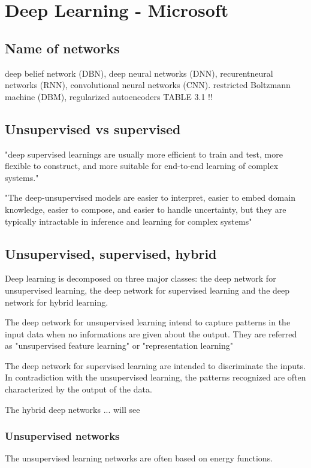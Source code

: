 



\section{Deep Learning - Microsoft}

	\subsection{Name of networks}
		deep belief network (DBN), 
		deep neural networks (DNN), recurentneural networks (RNN), convolutional neural networks (CNN).
		restricted Boltzmann machine (DBM), regularized autoencoders
		TABLE 3.1 !!

	\subsection{Unsupervised vs supervised}
		"deep supervised learnings are usually more efficient to train and test, more flexible to construct, and more suitable for end-to-end learning of complex systems."

		"The deep-unsupervised models are easier to interpret, easier to embed domain knowledge, easier to compose, and easier to handle uncertainty, but they are typically intractable in inference and learning for complex systems"


	\subsection{Unsupervised, supervised, hybrid}
		Deep learning is decomposed on three major classes: the deep network for unsupervised learning, the deep network for supervised learning and the deep network for hybrid learning.

		The deep network for unsupervised learning intend to capture patterns in the input data when no informations are given about the output. They are referred as "unsupervised feature learning" or "representation learning"

		The deep network for supervised learning are intended to discriminate the inputs. In contradiction with the unsupervised learning, the patterns recognized are often characterized by the output of the data.

		The hybrid deep networks ... will see


	\subsubsection{Unsupervised networks}
		The unsupervised learning networks are often based on energy functions.



